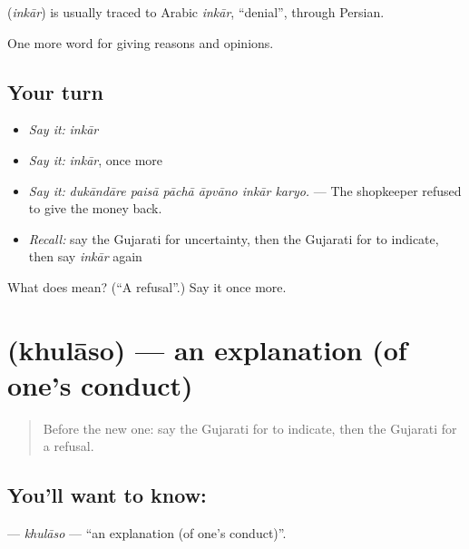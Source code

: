 \begin{cousinweb}
\textbf{} (\emph{inkār}) is usually traced to Arabic \emph{inkār}, \textquotedblleft{}denial\textquotedblright{}, through Persian.
\end{cousinweb}

\begin{grammarlens}[title={What you've built}]
One more word for giving reasons and opinions.
\end{grammarlens}

\subsection*{Your turn}
\begin{itemize}
\raggedright
  \item \emph{Say it:} \emph{inkār}
  \item \emph{Say it:} \emph{inkār}, once more
  \item \emph{Say it:} \emph{dukāndāre paisā pāchā āpvāno inkār karyo.} — The shopkeeper refused to give the money back.
  \item \emph{Recall:} say the Gujarati for uncertainty, then the Gujarati for to indicate, then say \emph{inkār} again
\end{itemize}

\begin{tcolorbox}[breakable,colback=teal!4,colframe=teal!35!black,title={Before you move on}]
What does  mean? (\textquotedblleft{}A refusal\textquotedblright{}.) Say it once more.
\end{tcolorbox}
\section[\texorpdfstring{\gu{ખુલાસો} (khulāso)}{ખુલાસો (khulāso)}]{ (khulāso) — an explanation (of one's conduct)}

\label{lesson:GU-C345-khulaso}



\begin{quote}
Before the new one: say the Gujarati for to indicate, then the Gujarati for a refusal.
\end{quote}

\subsection*{You'll want to know: }
\textbf{} — \emph{khulāso} — \textquotedblleft{}an explanation (of one's conduct)\textquotedblright{}.

